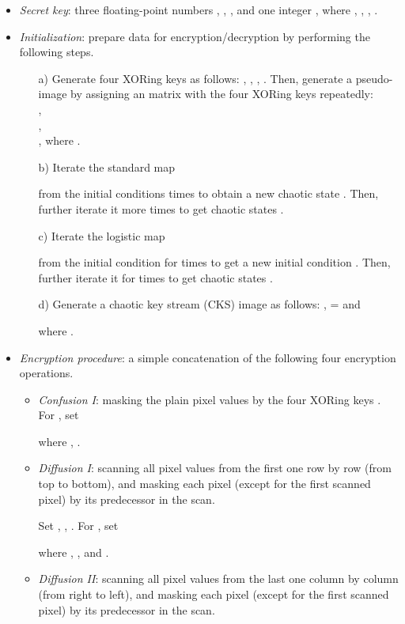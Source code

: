 \documentclass[twocolumn]{svjour3}
\begin{document}
\begin{itemize}
\item
\textit{Secret key}: three floating-point numbers , , ,
and one integer , where , , ,
.

\item
\textit{Initialization}: prepare data for encryption/decryption by
performing the following steps.
\begin{itemize}
\item[a)]
Generate four XORing keys as follows: , ,  , . Then, generate a pseudo-image
   by
assigning an  matrix with the four XORing keys repeatedly:\\
,\\
,\\
, where .

\item[b)]
Iterate the standard map

from the initial conditions   times to obtain a new chaotic state
. Then, further iterate it  more times to get
 chaotic states .

\item[c)]
Iterate the logistic map

from the initial condition  for  times to get a new
initial condition . Then, further iterate it for  times to
get  chaotic states .

\item[d)]
Generate a chaotic key stream (CKS) image  
 as
follows:
,  = and

where .
\end{itemize}

\item
\textit{Encryption procedure}: a simple concatenation of the
following four encryption operations.

\begin{itemize}
\item
\textit{Confusion I}: masking the plain pixel values by the four
XORing keys .
For , set

where , .

\item
\textit{Diffusion I}: scanning all pixel values from the first one
row by row (from top to bottom), and masking each pixel (except for
the first scanned pixel) by its predecessor in the scan.

Set , ,
. For , set

where , ,  and .

\item
\textit{Diffusion II}: scanning all pixel values from the last one
column by column (from right to left), and masking each pixel
(except for the first scanned pixel) by its predecessor in the scan.


\end{itemize}
\end{itemize}
\end{document}
